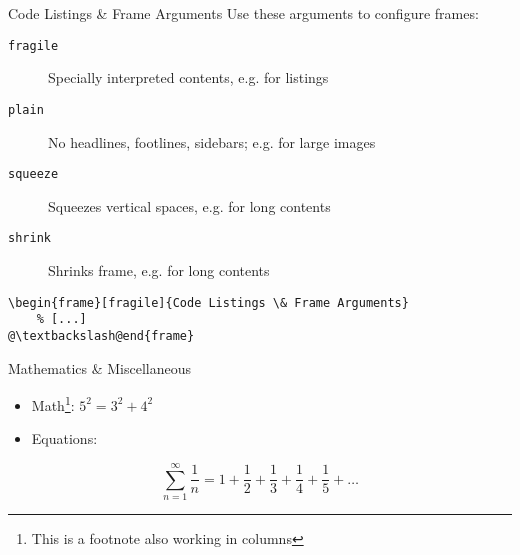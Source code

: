 \documentclass{beamer}
\begin{document}
\begin{frame}[fragile]{Code Listings \& Frame Arguments}
	Use these arguments to configure frames:
	\begin{description}
		\item[\texttt{fragile}\hfill]
		Specially interpreted contents, e.g. for listings
		\item[\texttt{plain}\hfill]
		No headlines, footlines, sidebars; e.g. for large images\\
		\item[\texttt{squeeze}\hfill]
		Squeezes vertical spaces, e.g. for long contents
		\item[\texttt{shrink}\hfill]
		Shrinks frame, e.g. for long contents
	\end{description}
	\begin{lstlisting}[caption={Frame Options}]
\begin{frame}[fragile]{Code Listings \& Frame Arguments}
	% [...]
@\textbackslash@end{frame}
	\end{lstlisting}
\end{frame}

\begin{frame}{Mathematics \& Miscellaneous}
	\begin{itemize}
		\item Math\footnote[frame]{This is a footnote also working in columns}: $5^{2}=3^{2}+4^{2}$
		\item Equations:
	\end{itemize}
	\begin{equation}
		\sum_{n = 1}^{\infty} \frac{1}{n} = 1 + \frac{1}{2} + \frac{1}{3} + \frac{1}{4} + \frac{1}{5} + \dots 
	\end{equation}
\end{frame}
\end{document}
